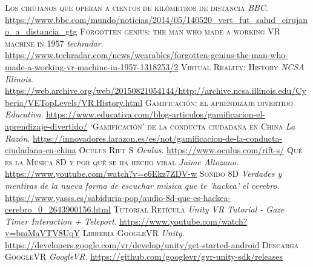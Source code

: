 	\begin{thebibliography}{99}
			\textsc{Los cirujanos que operan a cientos de kilómetros de distancia}
			\textit{BBC}.
			\newline
			\url{https://www.bbc.com/mundo/noticias/2014/05/140520_vert_fut_salud_cirujano_a_distancia_gtg}
			\textsc{Forgotten genius: the man who made a working VR machine in 1957}
			\textit{techradar}.
			\newline
			\url{https://www.techradar.com/news/wearables/forgotten-genius-the-man-who-made-a-working-vr-machine-in-1957-1318253/2}
			\textsc{Virtual Reality: History}
			\textit{NCSA Illinois}.
			\newline
			\url{https://web.archive.org/web/20150821054144/http://archive.ncsa.illinois.edu/Cyberia/VETopLevels/VR.History.html}
			\textsc{Gamificación: el aprendizaje divertido}
			\textit{Educativa}.
			\newline
			\url{https://www.educativa.com/blog-articulos/gamificacion-el-aprendizaje-divertido/}
			\textsc{‘Gamificación’ de la conducta ciudadana en China}
			\textit{La Razón}.
			\newline
			\url{https://innovadores.larazon.es/es/not/gamificacion-de-la-conducta-ciudadana-en-china}	
			\textsc{Oculus Rift S}
			\textit{Oculus}.
			\newline
			\url{https://www.oculus.com/rift-s/}
			\textsc{Qué es la Música 8D y por qué se ha hecho viral}
			\textit{Jaime Altozano}.
			\newline
			\url{https://www.youtube.com/watch?v=e6Ekz7ZDV-w}
			\textsc{Sonido 8D}
			\textit{Verdades y mentiras de la nueva forma de escuchar música que te 'hackea' el cerebro}.
			\newline
			\url{https://www.yasss.es/sabiduria-pop/audio-8d-que-es-hackea-cerebro_0_2643900156.html}
			\textsc{Tutorial Retícula}
			\textit{Unity VR Tutorial - Gaze Timer Interaction + Teleport}.
			\newline
			\url{https://www.youtube.com/watch?v=bmMaVTV8UqY}
			\textsc{Librería GoogleVR}
			\textit{Unity}.
			\newline
			\url{https://developers.google.com/vr/develop/unity/get-started-android}
			\textsc{Descarga GoogleVR}
			\textit{GoogleVR}.
			\newline
			\url{https://github.com/googlevr/gvr-unity-sdk/releases}

\end{thebibliography}
